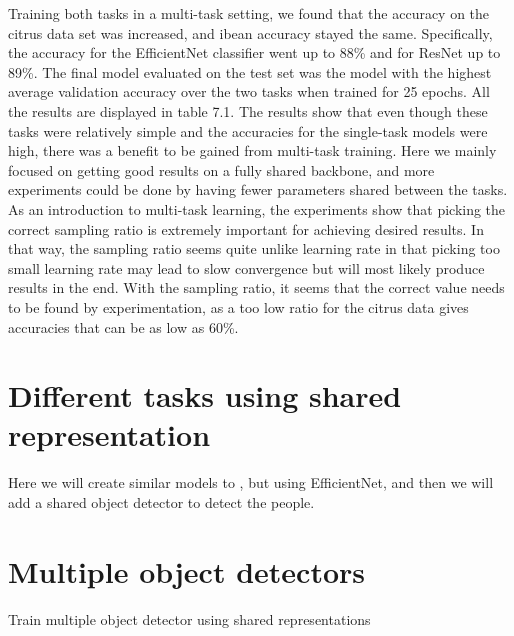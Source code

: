 Training both tasks in a multi-task setting, we found that the accuracy on the citrus data set was increased, and ibean accuracy stayed the same.
Specifically, the accuracy for the EfficientNet classifier went up to 88\% and for ResNet up to 89\%.
The final model evaluated on the test set was the model with the highest average validation accuracy over the two tasks when trained for 25 epochs.
All the results are displayed in table 7.1.
The results show that even though these tasks were relatively simple and the accuracies for the single-task models were high, there was a benefit to be gained from multi-task training.
Here we mainly focused on getting good results on a fully shared backbone, and more experiments could be done by having fewer parameters shared between the tasks.
As an introduction to multi-task learning, the experiments show that picking the correct sampling ratio is extremely important for achieving desired results.
In that way, the sampling ratio seems quite unlike learning rate in that picking too small learning rate may lead to slow convergence but will most likely produce results in the end.
With the sampling ratio, it seems that the correct value needs to be found by experimentation, as a too low ratio for the citrus data gives accuracies that can be as low as 60\%.





\section{Different tasks using shared representation}
Here we will create similar models to \citep{visualPerson}, but using EfficientNet, and then we will add a shared object detector to detect the people.

\section{Multiple object detectors}
Train multiple object detector using shared representations